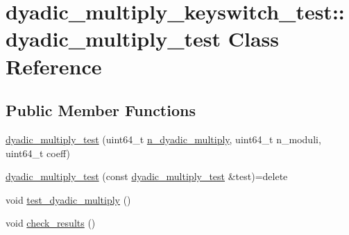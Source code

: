 \hypertarget{classdyadic__multiply__keyswitch__test_1_1dyadic__multiply__test}{\section{dyadic\-\_\-multiply\-\_\-keyswitch\-\_\-test\-:\-:dyadic\-\_\-multiply\-\_\-test Class Reference}
\label{classdyadic__multiply__keyswitch__test_1_1dyadic__multiply__test}
}
\subsection*{Public Member Functions}
\begin{DoxyCompactItemize}
\item 
\hyperlink{classdyadic__multiply__keyswitch__test_1_1dyadic__multiply__test_a979e3420fd9dd4f1d4bb7433ac460a3a}{dyadic\-\_\-multiply\-\_\-test} (uint64\-\_\-t \hyperlink{bench__dyadic__multiply_8cpp_a1249f7c009d650067cdc1e2254fcb63c}{n\-\_\-dyadic\-\_\-multiply}, uint64\-\_\-t n\-\_\-moduli, uint64\-\_\-t coeff)
\item 
\hyperlink{classdyadic__multiply__keyswitch__test_1_1dyadic__multiply__test_ab22cb28d366150fdd12d29e87ed746d0}{dyadic\-\_\-multiply\-\_\-test} (const \hyperlink{classdyadic__multiply__keyswitch__test_1_1dyadic__multiply__test}{dyadic\-\_\-multiply\-\_\-test} \&test)=delete
\item 
void \hyperlink{classdyadic__multiply__keyswitch__test_1_1dyadic__multiply__test_a1cd5299855144e2a72b5990c1d5f0cb0}{test\-\_\-dyadic\-\_\-multiply} ()
\item 
void \hyperlink{classdyadic__multiply__keyswitch__test_1_1dyadic__multiply__test_a258d1e94bcab934387b1db0e85bfe0c0}{check\-\_\-results} ()
\end{DoxyCompactItemize}


